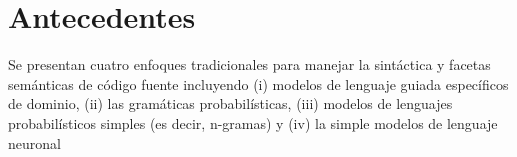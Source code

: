 \section{Antecedentes}

Se presentan cuatro enfoques tradicionales para manejar
la sintáctica y facetas semánticas de código fuente incluyendo
(i) modelos de lenguaje guiada específicos de dominio,
(ii) las gramáticas probabilísticas,
(iii) modelos de lenguajes probabilísticos simples (es decir, n-gramas)
y (iv) la simple modelos de lenguaje neuronal